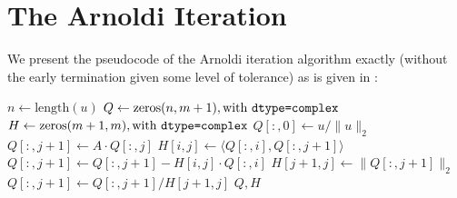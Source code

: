 \section{The Arnoldi Iteration}

We present the pseudocode of the Arnoldi iteration algorithm exactly (without the early termination given some level of tolerance) as is given in \citet{arnoldi2025lab}:

\begin{algorithm}[H]
    \begin{algorithmic}
        \State$n\gets\text{length}(u)$
        \State$Q\gets\text{zeros}(n,m+1),\text{with }\verb|dtype=complex|$
        \State$H\gets\text{zeros}(m+1,m),\text{with }\verb|dtype=complex|$
        \State$Q[:,0]\gets u/\|u\|_2$
        \State$Q[:,j+1]\gets A\cdot Q[:,j]$
        \State$H[i,j]\gets\langle Q[:,i],Q[:,j+1]\rangle$
        \State$Q[:,j+1]\gets Q[:,j+1]-H[i,j]\cdot Q[:,i]$
        \EndFor
        \State$H[j+1,j]\gets\|Q[:,j+1]\|_2$
        \State$Q[:,j+1]\gets Q[:,j+1]/H[j+1,j]$
        \EndFor
        \State\Return$Q,H$
        \EndProcedure
    \end{algorithmic}
\end{algorithm}

